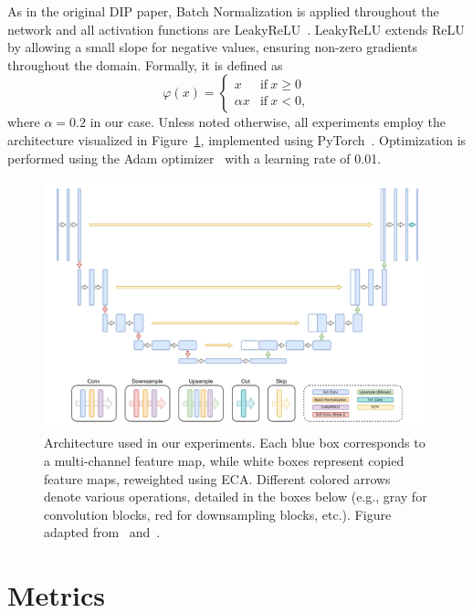 As in the original DIP paper, Batch Normalization is applied throughout the network and all activation functions are LeakyReLU~\cite{LeakyReLU}.
LeakyReLU extends ReLU by allowing a small slope for negative values, ensuring non-zero gradients throughout the domain.
Formally, it is defined as
\begin{equation}
    \varphi(x) = \begin{cases}
        x &\text{if}\ x \geq 0\\
        \alpha x &\text{if}\ x < 0,
    \end{cases}
\end{equation}
where $\alpha = 0.2$ in our case.
Unless noted otherwise, all experiments employ the architecture visualized in Figure~\ref{fig:architecture}, implemented using PyTorch~\cite{PyTorch}.
Optimization is performed using the Adam optimizer~\cite{Adam} with a learning rate of 0.01.

\begin{figure}
    \centering
    \includegraphics[width=\textwidth]{img/fig_5.2.pdf}
    \caption{
        Architecture used in our experiments.
        Each blue box corresponds to a multi-channel feature map, while white boxes represent copied feature maps, reweighted using ECA\@.
        Different colored arrows denote various operations, detailed in the boxes below (e.g., gray for convolution blocks, red for downsampling blocks, etc.).
        Figure adapted from~\cite{U-Net} and~\cite{DIP}.
    }\label{fig:architecture}
\end{figure}

\newpage

\section{Metrics}

